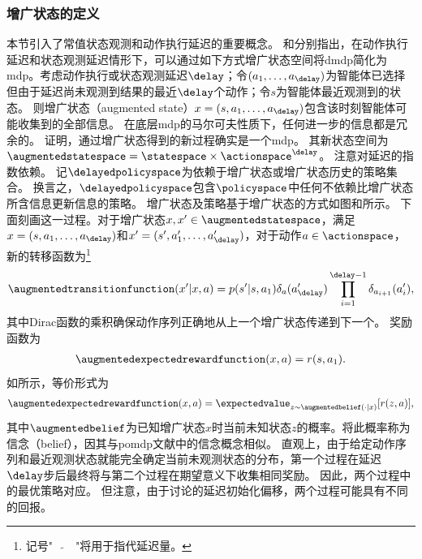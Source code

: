 \subsubsection{增广状态的定义}
\label{subsubsec:theory_augmented_space}
本节引入了常值状态观测和动作执行延迟的重要概念。
\cite{bertsekas1987dynamic}和\cite{altman1992closed}分别指出，在动作执行延迟和状态观测延迟情形下，可以通过如下方式增广状态空间将\gls{dmdp}简化为\gls{mdp}。考虑动作执行或状态观测延迟$\delay$；令$(a_1,\dots,a_{\delay})$为智能体已选择但由于延迟尚未观测到结果的最近$\delay$个动作；令$s$为智能体最近观测到的状态。
则增广状态（augmented state）$x=(s,a_1,\dots,a_\delay)$包含该时刻智能体可能收集到的全部信息。
在底层\gls{mdp}的马尔可夫性质下，任何进一步的信息都是冗余的。
\cite{bertsekas1987dynamic,altman1992closed}证明，通过增广状态得到的新过程确实是一个\gls{mdp}。
其新状态空间为$\augmentedstatespace=\statespace\times\actionspace^\delay$。
注意对延迟的指数依赖。
记$\delayedpolicyspace$为依赖于增广状态或增广状态历史的策略集合。
换言之，$\delayedpolicyspace$包含$\policyspace$中任何不依赖比增广状态所含信息更新信息的策略。
增广状态及策略基于增广状态的方式如图和所示。
下面刻画这一过程。对于增广状态$x,x'\in\augmentedstatespace$，满足$x=(s,a_1,\dots,a_{\delay})$和$x'=(s',a_1',\dots,a_{\delay}')$，对于动作$a\in\actionspace$，新的转移函数为\footnote{记号"~~$\widetilde{}$~~"将用于指代延迟量。}
\begin{align*}
    \augmentedtransitionfunction(x'\vert x,a) = p(s'\vert s,a_1)\delta_a(a_{\delay}')\prod_{i=1}^{\delay-1}\delta_{a_{i+1}}(a_{i}'),
\end{align*}
其中Dirac函数的乘积确保动作序列正确地从上一个增广状态传递到下一个。
奖励函数为
\begin{align}
\label{eq:delayed_reward_deterministic}
    \augmentedexpectedrewardfunction(x,a) = r(s,a_1).
\end{align}
如\cite[Lemma~1]{katsikopoulos2003markov}所示，等价形式为
\begin{align}
\label{eq:delayed_reward_expected}
    \augmentedexpectedrewardfunction(x,a) = \expectedvalue_{z\sim \augmentedbelief(\cdot\vert x)} [r(z,a)],
\end{align}
其中$\augmentedbelief$为已知增广状态$x$时当前未知状态$z$的概率。将此概率称为信念（belief），因其与\gls{pomdp}文献中的信念概念相似。
直观上，由于给定动作序列和最近观测状态就能完全确定当前未观测状态的分布，第一个过程在延迟$\delay$步后最终将与第二个过程在期望意义下收集相同奖励。
因此，两个过程中的最优策略对应。
但注意，由于讨论的延迟初始化偏移，两个过程可能具有不同的回报。

